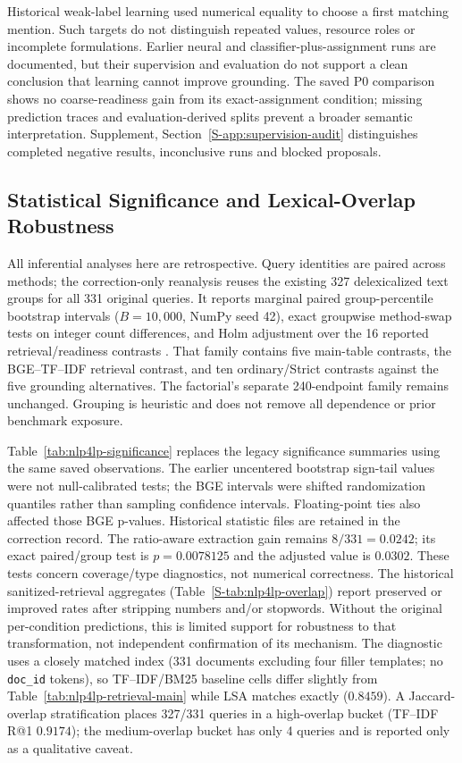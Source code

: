 \documentclass[pdflatex,sn-basic,Numbered]{sn-jnl}
\begin{document}
Historical weak-label learning used numerical equality to choose a first matching mention. Such targets do not distinguish repeated values, resource roles or incomplete formulations. Earlier neural and classifier-plus-assignment runs are documented, but their supervision and evaluation do not support a clean conclusion that learning cannot improve grounding. The saved P0 comparison shows no coarse-readiness gain from its exact-assignment condition; missing prediction traces and evaluation-derived splits prevent a broader semantic interpretation. Supplement, Section~\ref{S-app:supervision-audit} distinguishes completed negative results, inconclusive runs and blocked proposals.

\subsection{Statistical Significance and Lexical-Overlap Robustness}
\label{subsec:exp_significance}

All inferential analyses here are retrospective. Query identities are paired across methods; the correction-only reanalysis reuses the existing 327 delexicalized text groups for all 331 original queries. It reports marginal paired group-percentile bootstrap intervals ($B=10{,}000$, NumPy seed 42), exact groupwise method-swap tests on integer count differences, and Holm adjustment over the 16 reported retrieval/readiness contrasts \cite{holm1979followup}. That family contains five main-table contrasts, the BGE--TF--IDF retrieval contrast, and ten ordinary/Strict contrasts against the five grounding alternatives. The factorial's separate 240-endpoint family remains unchanged. Grouping is heuristic and does not remove all dependence or prior benchmark exposure.

Table~\ref{tab:nlp4lp-significance} replaces the legacy significance summaries using the same saved observations. The earlier uncentered bootstrap sign-tail values were not null-calibrated tests; the BGE intervals were shifted randomization quantiles rather than sampling confidence intervals. Floating-point ties also affected those BGE p-values. Historical statistic files are retained in the correction record. The ratio-aware extraction gain remains $8/331=0.0242$; its exact paired/group test is $p=0.0078125$ and the adjusted value is $0.0302$. These tests concern coverage/type diagnostics, not numerical correctness.
The historical sanitized-retrieval aggregates (Table~\ref{S-tab:nlp4lp-overlap}) report preserved or improved rates after stripping numbers and/or stopwords. Without the original per-condition predictions, this is limited support for robustness to that transformation, not independent confirmation of its mechanism. The diagnostic uses a closely matched index (331 documents excluding four filler templates; no \texttt{doc\_id} tokens), so TF--IDF/BM25 baseline cells differ slightly from Table~\ref{tab:nlp4lp-retrieval-main} while LSA matches exactly ($0.8459$). A Jaccard-overlap stratification places 327/331 queries in a high-overlap bucket (TF--IDF R@1 $0.9174$); the medium-overlap bucket has only 4 queries and is reported only as a qualitative caveat.
\end{document}
